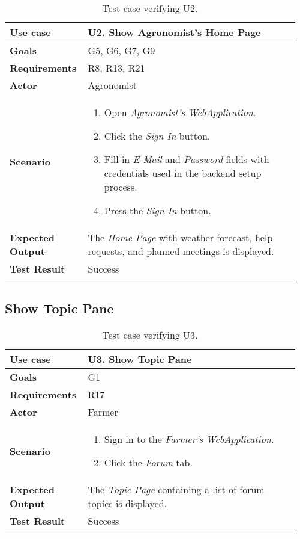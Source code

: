 \begin{longtable}{@{}p{0.25\linewidth}p{0.71\linewidth}@{}}
	\toprule
	\textbf{Use case} & \textbf{U2.} Show Agronomist's Home Page\\
	\midrule
	\textbf{Goals} & G5, G6, G7, G9\\
	\midrule
	\textbf{Requirements} & R8, R13, R21\\
	\midrule
	\textbf{Actor} & Agronomist\\
	\midrule
	\textbf{Scenario} & 
	\begin{enumerate}[leftmargin=.4cm,noitemsep,topsep=0pt,before=\vspace{-3mm},after=\vspace{-4mm}]
		\item Open \textit{Agronomist's WebApplication}.
		\item Click the \textit{Sign In} button.
		\item Fill in \textit{E-Mail} and \textit{Password} fields with credentials used in the backend setup process.
		\item Press the \textit{Sign In} button.
	\end{enumerate}\\
	\midrule
	\textbf{Expected Output} & The \textit{Home Page} with weather forecast, help requests, and planned meetings is displayed.\\
	\midrule
	\textbf{Test Result} & Success\\
	\bottomrule
	\caption{Test case verifying U2.}
\end{longtable}

\subsection{Show Topic Pane}

\begin{longtable}{@{}p{0.25\linewidth}p{0.71\linewidth}@{}}
	\toprule
	\textbf{Use case} & \textbf{U3.} Show Topic Pane\\
	\midrule
	\textbf{Goals} & G1\\
	\midrule
	\textbf{Requirements} & R17\\
	\midrule
	\textbf{Actor} & Farmer\\
	\midrule
	\textbf{Scenario} & 
	\begin{enumerate}[leftmargin=.4cm,noitemsep,topsep=0pt,before=\vspace{-3mm},after=\vspace{-4mm}]
		\item Sign in to the \textit{Farmer's WebApplication}.
		\item Click the \textit{Forum} tab.
	\end{enumerate}\\
	\midrule
	\textbf{Expected Output} & The \textit{Topic Page} containing a list of forum topics is displayed.\\
	\midrule
	\textbf{Test Result} & Success\\
	\bottomrule
	\caption{Test case verifying U3.}
\end{longtable}

